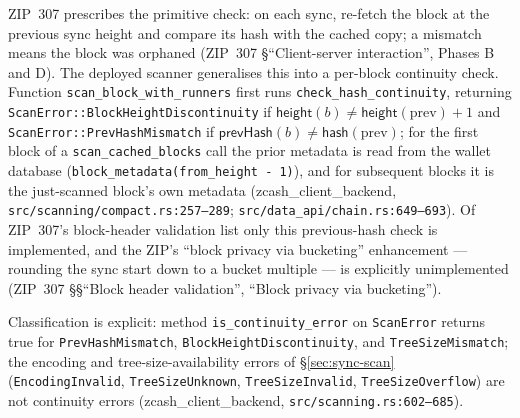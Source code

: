 \documentclass[11pt,a4paper]{article}
\theoremstyle{definition}
\begin{document}
ZIP~307 prescribes the primitive check: on each sync, re-fetch the block at
the previous sync height and compare its hash with the cached copy; a
mismatch means the block was orphaned (ZIP~307 \S``Client-server
interaction'', Phases B and D). The
deployed scanner generalises this into a per-block continuity check.
Function \texttt{scan\_block\_with\_runners} first runs
\texttt{check\_hash\_continuity}, returning
\texttt{ScanError::BlockHeightDiscontinuity} if
$\mathsf{height}(b) \ne \mathsf{height}(\mathrm{prev}) + 1$ and
\texttt{ScanError::PrevHashMismatch} if
$\mathsf{prevHash}(b) \ne \mathsf{hash}(\mathrm{prev})$; for the first
block of a \texttt{scan\_cached\_blocks} call the prior metadata is read
from the wallet database (\texttt{block\_metadata(from\_height - 1)}), and
for subsequent blocks it is the just-scanned block's own metadata
(\textsf{zcash\_client\_backend}, \texttt{src/scanning/compact.rs:257--289};
\texttt{src/data\_api/chain.rs:649--693}). Of ZIP~307's block-header
validation list only this previous-hash check is implemented, and the
ZIP's ``block privacy via bucketing'' enhancement --- rounding the sync
start down to a bucket multiple --- is explicitly unimplemented
(ZIP~307 \S\S``Block header validation'', ``Block privacy via
bucketing'').

Classification is explicit: method \texttt{is\_continuity\_error} on
\texttt{ScanError} returns true for \texttt{PrevHashMismatch},
\texttt{BlockHeightDiscontinuity}, and \texttt{TreeSizeMismatch}; the
encoding and tree-size-availability errors of \S\ref{sec:sync-scan}
(\texttt{EncodingInvalid}, \texttt{TreeSizeUnknown},
\texttt{TreeSizeInvalid}, \texttt{TreeSizeOverflow}) are not continuity
errors (\textsf{zcash\_client\_backend}, \texttt{src/scanning.rs:602--685}).
\end{document}
